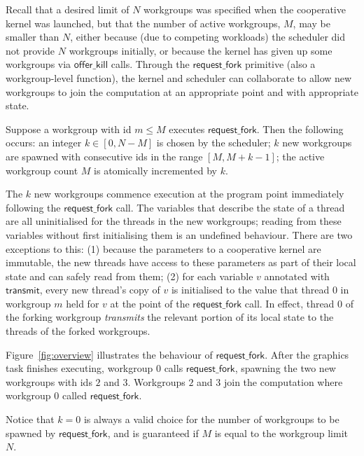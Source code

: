 \documentclass[sigconf]{acmart}
\newcommand{\myfiglong}{Figure~}
\newcommand{\mysec}{Sec.~}
\newcommand{\transmit}{\mathsf{transmit}}
\newcommand{\offerfork}{\mathsf{request\_fork}}
\newcommand{\offerkill}{\mathsf{offer\_kill}}
\begin{document}
{%
\myparagraph{Semantics for $\offerfork$}
%
Recall that a desired limit of $N$ workgroups was specified when the
cooperative kernel was launched, but that the number of active
workgroups, $M$, may be smaller than $N$, either because (due to
competing workloads) the scheduler did not provide $N$ workgroups
initially, or because the kernel has given up some workgroups via
$\offerkill$ calls.  Through the $\offerfork$ primitive (also a
workgroup-level function), the kernel and scheduler can collaborate to
allow new workgroups to join the computation at an appropriate point
and with appropriate state.

Suppose a workgroup with id $m\leq M$ executes $\offerfork$.  Then the
following occurs: an integer $k \in [0, N-M]$ is chosen by the
scheduler; $k$ new workgroups are spawned with consecutive ids in the
range $[M, M+k-1]$; the active workgroup count $M$ is atomically
incremented by $k$.

The $k$ new workgroups commence execution at the program point
immediately following the $\offerfork$ call.  The variables that
describe the state of a thread are all uninitialised for the threads
in the new workgroups; reading from these variables without first
initialising them is an undefined behaviour.  There are two exceptions
to this: (1) because the parameters to a cooperative kernel are
immutable, the new threads have access to these parameters as part of
their local state and can safely read from them; (2) for each variable
$v$ annotated with $\transmit$, every new thread's copy of $v$ is
initialised to the value that thread 0 in workgroup $m$ held for $v$
at the point of the $\offerfork$ call.
%
In effect, thread 0 of the forking workgroup \emph{transmits} the relevant
portion of its local state to the threads of the forked workgroups.

\myfiglong{\ref{fig:overview}} illustrates the behaviour of
$\offerfork$. After the graphics task finishes executing, workgroup
$0$ calls $\offerfork$, spawning the two new workgroups with ids $2$
and $3$. Workgroups $2$ and $3$ join the computation where workgroup
$0$ called $\offerfork$.
%
%

Notice that $k=0$ is always a valid choice for the number of
workgroups to be spawned by $\offerfork$, and is guaranteed if $M$ is
equal to the workgroup limit $N$.


}
\end{document}
